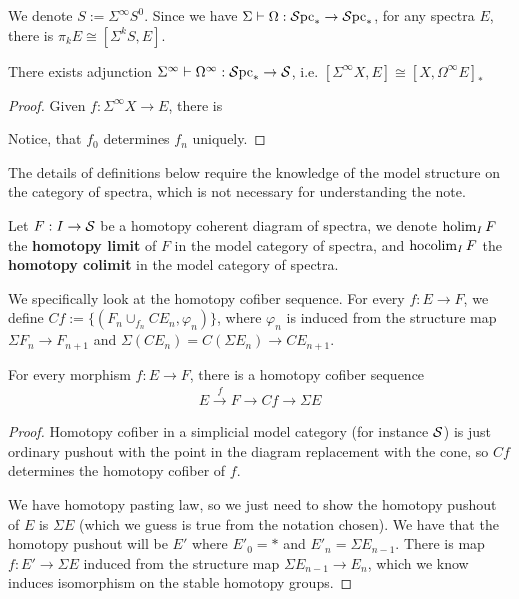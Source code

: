 We denote $S:=\Sigma^\infty S^0$. Since we have $\Sigma \vdash \Omega: \operatorname{\mathcal{S}pc}_*\to \operatorname{\mathcal{S}pc}_*$, for any spectra $E$, there is $\pi_kE\cong [\Sigma ^kS, E]$.

\begin{theorem}
    There exists adjunction $\Sigma^\infty\vdash \Omega^\infty: \operatorname{\mathcal{S}pc}_*\to \operatorname{\mathcal{S}}$, i.e. $[\Sigma^\infty X, E]\cong [X, \Omega^\infty E]_*$
\end{theorem}
\begin{proof}
    Given $f:\Sigma^\infty X\to E$, there is 

    \begin{center}

    \end{center}
    Notice, that $f_0$ determines $f_n$ uniquely.
\end{proof}


The details of definitions below require the knowledge of the model structure on the category of spectra, which is not necessary for understanding the note.

\begin{definition}
    Let $F: I\to \operatorname{\mathcal{S}}$ be a homotopy coherent diagram of spectra, we denote $\operatorname{holim}_IF$ the \textbf{homotopy limit} of $F$ in the model category of spectra, and $\operatorname{hocolim}_I F$ the \textbf{homotopy colimit} in the model category of spectra.
\end{definition}

We specifically look at the homotopy cofiber sequence. For every $f: E\to F$, we define $Cf:=\{ (F_n\cup_{f_n}CE_n, \varphi_n)\}$, where $\varphi_n$ is induced from the structure map $\Sigma F_n\to F_{n+1}$ and $\Sigma (CE_n)=C(\Sigma E_n)\to CE_{n+1}$.

\begin{proposition}
    \cite{PreSwitzer}
    For every morphism $f: E\to F$, there is a homotopy cofiber sequence
    \begin{align*}
        E\xrightarrow{f}F\to Cf\to \Sigma E
    \end{align*}
\end{proposition}
\begin{proof}
Homotopy cofiber in a simplicial model category (for instance $\operatorname{\mathcal{S}}$) is just ordinary pushout with the point in the diagram replacement with the cone, so $Cf$ determines the homotopy cofiber of $f$.

We have homotopy pasting law, so we just need to show the homotopy pushout of $E$ is $\Sigma E$ (which we guess is true from the notation chosen). We have that the homotopy pushout will be $E'$ where $E'_0=*$ and $E'_n=\Sigma E_{n-1}$. There is map $f: E' \to \Sigma E$ induced from the structure map $\Sigma E_{n-1}\to E_n$, which we know induces isomorphism on the stable homotopy groups. 
\end{proof}

